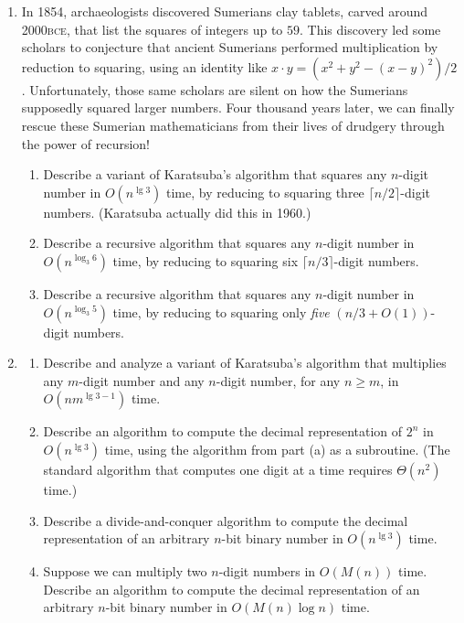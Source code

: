 \begin{exercises}
\begin{enumerate}[label=\arabic*.,ref=\thechapter.\arabic*,leftmargin=*,align=left,itemsep=1.5ex plus 0.5ex,resume]
\item In 1854, archaeologists discovered Sumerians clay tablets, carved around 2000\textsc{bce}, that list the squares of integers up to $59$. This discovery led some scholars to conjecture that ancient Sumerians performed multiplication by reduction to squaring, using an identity like $x \cdot y = (x^2 + y^2 - (x - y)^2)/2$. Unfortunately, those same scholars are silent on how the Sumerians supposedly squared larger numbers. Four thousand years later, we can finally rescue these Sumerian mathematicians from their lives of drudgery through the power of recursion!
\begin{enumerate}
\item Describe a variant of Karatsuba’s algorithm that squares any $n$-digit number in $O(n^{\lg 3})$ time, by reducing to squaring three $\lceil n/2\rceil$-digit numbers. (Karatsuba actually did this in 1960.)
\item Describe a recursive algorithm that squares any $n$-digit number in $O(n^{\log_3 6})$ time, by reducing to squaring six $\lceil n/3\rceil$-digit numbers.
\item {} Describe a recursive algorithm that squares any $n$-digit number in $O(n^{\log_3 5})$ time, by reducing to squaring only \emph{five} $(n/3 + O(1))$-digit numbers. 
\end{enumerate}
\item
\begin{enumerate}
\item Describe and analyze a variant of Karatsuba’s algorithm that multiplies any $m$-digit number and any $n$-digit number, for any $n \ge m$, in $O(nm^{\lg 3 - 1})$ time.
\item Describe an algorithm to compute the decimal representation of $2^n$ in $O(n^{\lg 3})$ time, using the algorithm from part (a) as a subroutine. (The standard algorithm that computes one digit at a time requires $\Theta(n^2)$ time.)
\item Describe a divide-and-conquer algorithm to compute the decimal representation of an arbitrary $n$-bit binary number in $O(n^{\lg 3})$ time. 
\item {} Suppose we can multiply two $n$-digit numbers in $O(M(n))$ time. Describe an algorithm to compute the decimal representation of an arbitrary $n$-bit binary number in $O(M(n) \log n)$ time. 

\end{enumerate}
\end{enumerate}
\end{exercises}
